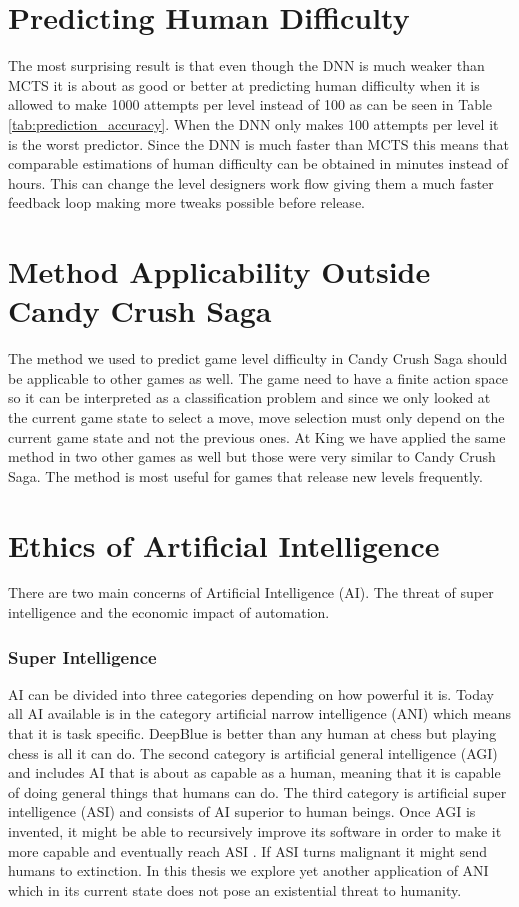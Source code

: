 \documentclass{kththesis}
\begin{document}
\section{Predicting Human Difficulty}
The most surprising result is that even though the DNN is much weaker than MCTS it is about as good or better at predicting human difficulty when it is allowed to make 1000 attempts per level instead of 100 as can be seen in Table \ref{tab:prediction_accuracy}. When the DNN only makes 100 attempts per level it is the worst predictor. Since the DNN is much faster than MCTS this means that comparable estimations of human difficulty can be obtained in minutes instead of hours. This can change the level designers work flow  giving them a much faster feedback loop making more tweaks possible before release.

\section{Method Applicability Outside Candy Crush Saga}
The method we used to predict game level difficulty in Candy Crush Saga should be applicable to other games as well. The game need to have a finite action space so it can be interpreted as a classification problem and since we only looked at the current game state to select a move, move selection must only depend on the current game state and not the previous ones. At King we have applied the same method in two other games as well but those were very similar to Candy Crush Saga. The method is most useful for games that release new levels frequently.

\section{Ethics of Artificial Intelligence}
There are two main concerns of Artificial Intelligence (AI). The threat of super intelligence and the economic impact of automation.

\subsubsection{Super Intelligence}
AI can be  divided into three categories  depending on how powerful it is. Today all AI available is in the category artificial narrow intelligence (ANI) which means that it is task specific. DeepBlue is better than any human at chess but playing chess is all it can do. The second category is artificial general intelligence (AGI) and  includes AI that is about as capable as a human, meaning that it is capable of doing general things that humans can do. The third category is  artificial super intelligence (ASI) and  consists of AI superior to human beings. Once AGI is invented, it might be able to recursively improve its software in order to make it more capable and eventually reach ASI \cite{bostrom1998long}. If ASI turns malignant it might send humans to extinction. In this thesis we explore yet another application of ANI which in its current state does not pose an existential threat to humanity.
\end{document}
